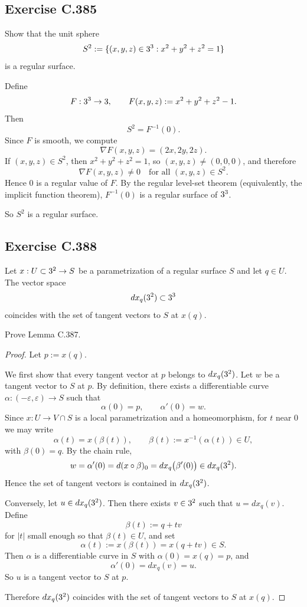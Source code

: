 \documentclass{article}
\begin{document}
\subsection{Exercise C.385}

Show that the unit sphere
\[
  S^2 := \{(x,y,z)\in3^3 : x^2+y^2+z^2=1\}
\]
is a regular surface.

\begin{solution}
  Define
  \[
    F:3^3\to3, \qquad F(x,y,z):=x^2+y^2+z^2-1.
  \]
  Then
  \[
    S^2 = F^{-1}(0).
  \]
  Since $F$ is smooth, we compute
  \[
    \nabla F(x,y,z)=(2x,2y,2z).
  \]
  If $(x,y,z)\in S^2$, then $x^2+y^2+z^2=1$, so $(x,y,z)\neq(0,0,0)$, and
  therefore
  \[
    \nabla F(x,y,z)\neq 0 \quad \text{for all } (x,y,z)\in S^2.
  \]
  Hence $0$ is a regular value of $F$. By the regular level-set theorem
  (equivalently, the implicit function theorem), $F^{-1}(0)$ is a regular
  surface of $3^3$.

  So $S^2$ is a regular surface.
\end{solution}

\subsection{Exercise C.388}

\begin{lemma}[Lemma C.387]
  Let $x : U\subset3^2 \to S$ be a parametrization of a regular surface
  $S$ and let $q\in U$. The vector space
  \[
    dx_q(3^2)\subset3^3
  \]
  coincides with the set of tangent vectors to $S$ at $x(q)$.
\end{lemma}

Prove Lemma C.387.

\begin{proof}
  Let $p:=x(q)$.

  We first show that every tangent vector at $p$ belongs to $dx_q(3^2)$.
  Let $w$ be a tangent vector to $S$ at $p$. By definition, there exists
  a differentiable curve $\alpha:(-\varepsilon,\varepsilon)\to S$ such that
  \[
    \alpha(0)=p, \qquad \alpha'(0)=w.
  \]
  Since $x:U\to V\cap S$ is a local parametrization and a homeomorphism,
  for $t$ near $0$ we may write
  \[
    \alpha(t)=x(\beta(t)), \qquad
    \beta(t):=x^{-1}(\alpha(t))\in U,
  \]
  with $\beta(0)=q$. By the chain rule,
  \[
    w=\alpha'(0)=d(x\circ\beta)_0=dx_q\big(\beta'(0)\big)\in dx_q(3^2).
  \]
  Hence the set of tangent vectors is contained in $dx_q(3^2)$.

  Conversely, let $u\in dx_q(3^2)$. Then there exists $v\in3^2$ such that
  $u=dx_q(v)$. Define
  \[
    \beta(t):=q+tv
  \]
  for $|t|$ small enough so that $\beta(t)\in U$, and set
  \[
    \alpha(t):=x(\beta(t))=x(q+tv)\in S.
  \]
  Then $\alpha$ is a differentiable curve in $S$ with $\alpha(0)=x(q)=p$, and
  \[
    \alpha'(0)=dx_q(v)=u.
  \]
  So $u$ is a tangent vector to $S$ at $p$.

  Therefore $dx_q(3^2)$ coincides with the set of tangent vectors to $S$
  at $x(q)$.
\end{proof}
\end{document}
